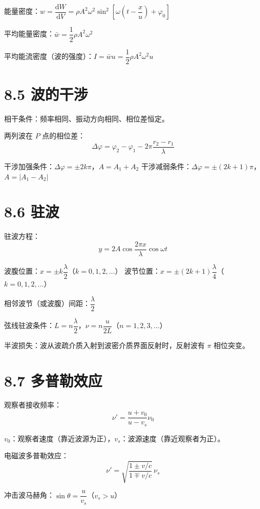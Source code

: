 \documentclass{ctexart}
\begin{document}
能量密度：$w = \dfrac{\mathrm{d}W}{\mathrm{d}V} = \rho A^{2}\omega^{2}\sin^{2}\left[\omega\left(t - \dfrac{x}{u}\right) + \varphi_0\right]$

平均能量密度：$\bar{w} = \dfrac12 \rho A^{2}\omega^{2}$

平均能流密度（波的强度）：$I = \bar{w}u = \dfrac12 \rho A^{2}\omega^{2}u$

\section*{8.5 波的干涉}

相干条件：频率相同、振动方向相同、相位差恒定。

两列波在 $P$ 点的相位差：
\[
\Delta\varphi = \varphi_2 - \varphi_1 - 2\pi\frac{r_2 - r_1}{\lambda}
\]

干涉加强条件：$\Delta\varphi = \pm 2k\pi$，$A = A_1 + A_2$
干涉减弱条件：$\Delta\varphi = \pm (2k+1)\pi$，$A = |A_1 - A_2|$

\section*{8.6 驻波}

驻波方程：
\[
y = 2A\cos\frac{2\pi x}{\lambda}\cos\omega t
\]

波腹位置：$x = \pm k\dfrac{\lambda}{2}$（$k = 0,1,2,\dots$）
波节位置：$x = \pm (2k+1)\dfrac{\lambda}{4}$（$k = 0,1,2,\dots$）

相邻波节（或波腹）间距：$\dfrac{\lambda}{2}$

弦线驻波条件：$L = n\dfrac{\lambda}{2}$，$\nu = n\dfrac{u}{2L}$（$n = 1,2,3,\dots$）

半波损失：波从波疏介质入射到波密介质界面反射时，反射波有 $\pi$ 相位突变。

\section*{8.7 多普勒效应}

观察者接收频率：
\[
\nu' = \frac{u + v_0}{u - v_s}\nu_0
\]

$v_0$：观察者速度（靠近波源为正），$v_s$：波源速度（靠近观察者为正）。

电磁波多普勒效应：
\[
\nu' = \sqrt{\frac{1 \pm v/c}{1 \mp v/c}}\,\nu_s
\]

冲击波马赫角：$\sin\theta = \dfrac{u}{v_s}$（$v_s > u$）
\end{document}
